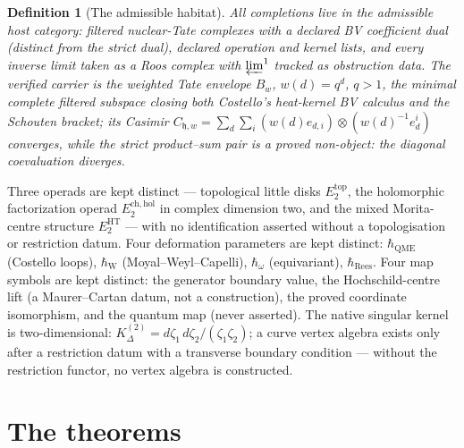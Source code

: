 \documentclass[11pt]{article}
\providecommand{\fh}{\mathfrak{h}}
\providecommand{\hbW}{\hbar_{\mathrm{W}}}
\providecommand{\hbQME}{\hbar_{\mathrm{QME}}}
\newtheorem{definition}[theorem]{Definition}
\begin{document}
\begin{definition}[The admissible habitat]
All completions live in the admissible host category: filtered
nuclear-Tate complexes with a \emph{declared} BV coefficient dual
\textup{(distinct from the strict dual)}, declared operation and
kernel lists, and every inverse limit taken as a Roos complex with
$\varprojlim^1$ tracked as obstruction data. The verified carrier is
the weighted Tate envelope $B_w$, $w(d)=q^d$, $q>1$, the minimal
complete filtered subspace closing both Costello's heat-kernel BV
calculus and the Schouten bracket; its Casimir
$C_{\fh,w}=\sum_d\sum_i(w(d)e_{d,i})\otimes(w(d)^{-1}e^i_d)$
converges, while the strict product--sum pair is a proved
\emph{non-object}: the diagonal coevaluation diverges.
\end{definition}

Three operads are kept distinct --- topological little disks
$E_2^{\mathrm{top}}$, the holomorphic factorization operad
$E_2^{\mathrm{ch,hol}}$ in complex dimension two, and the mixed
Morita-centre structure $E_2^{\mathrm{HT}}$ --- with no identification
asserted without a topologisation or restriction datum. Four
deformation parameters are kept distinct: $\hbQME$ \textup{(Costello
loops)}, $\hbW$ \textup{(Moyal--Weyl--Capelli)}, $\hbar_\omega$
\textup{(equivariant)}, $\hbar_{\mathrm{Rees}}$. Four map symbols
are kept distinct: the generator boundary value, the
Hochschild-centre lift \textup{(a Maurer--Cartan datum, not a
construction)}, the proved coordinate isomorphism, and the quantum
map \textup{(never asserted)}. The native singular kernel is
two-dimensional: $K^{(2)}_\Delta=d\zeta_1\,d\zeta_2/(\zeta_1\zeta_2)$;
a curve vertex algebra exists only after a restriction datum with a
transverse boundary condition --- without the restriction functor, no
vertex algebra is constructed.

\section{The theorems}\label{sec:theorems}
\end{document}

